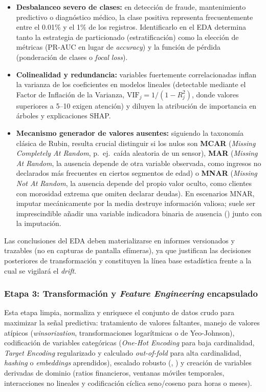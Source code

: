 \begin{itemize}
  \item \textbf{Desbalanceo severo de clases:} en detección de fraude, mantenimiento predictivo o diagnóstico médico, la clase positiva representa frecuentemente entre el 0.01\% y el 1\% de los registros. Identificarlo en el EDA determina tanto la estrategia de particionado (estratificación) como la elección de métricas (PR-AUC en lugar de \textit{accuracy}) y la función de pérdida (ponderación de clases o \textit{focal loss}).
  \item \textbf{Colinealidad y redundancia:} variables fuertemente correlacionadas inflan la varianza de los coeficientes en modelos lineales (detectable mediante el Factor de Inflación de la Varianza, $\text{VIF}_j = 1 / (1 - R_j^2)$, donde valores superiores a 5--10 exigen atención) y diluyen la atribución de importancia en árboles y explicaciones SHAP.
  \item \textbf{Mecanismo generador de valores ausentes:} siguiendo la taxonomía clásica de Rubin, resulta crucial distinguir si los nulos son \textbf{MCAR} (\textit{Missing Completely At Random}, p.~ej.\ caída aleatoria de un sensor), \textbf{MAR} (\textit{Missing At Random}, la ausencia depende de otra variable observada, como ingresos no declarados más frecuentes en ciertos segmentos de edad) o \textbf{MNAR} (\textit{Missing Not At Random}, la ausencia depende del propio valor oculto, como clientes con morosidad extrema que omiten declarar deudas). En escenarios MNAR, imputar mecánicamente por la media destruye información valiosa; suele ser imprescindible añadir una variable indicadora binaria de ausencia () junto con la imputación.
\end{itemize}

Las conclusiones del EDA deben materializarse en informes versionados y trazables (no en capturas de pantalla efímeras), ya que justifican las decisiones posteriores de transformación y constituyen la línea base estadística frente a la cual se vigilará el \textit{drift}.

\subsubsection{Etapa 3: Transformación y \textit{Feature Engineering} encapsulado}

Esta etapa limpia, normaliza y enriquece el conjunto de datos crudo para maximizar la señal predictiva: tratamiento de valores faltantes, manejo de valores atípicos (\textit{winsorization}, transformaciones logarítmicas o de Yeo-Johnson), codificación de variables categóricas (\textit{One-Hot Encoding} para baja cardinalidad, \textit{Target Encoding} regularizado y calculado \textit{out-of-fold} para alta cardinalidad, \textit{hashing} o \textit{embeddings} aprendidos), escalado robusto (, ) y creación de variables derivadas de dominio (ratios financieros, ventanas móviles temporales, interacciones no lineales y codificación cíclica seno/coseno para horas o meses).

